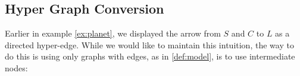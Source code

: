 \documentclass{article}
\begin{document}
	\subsection{Hyper Graph Conversion}\label{sec:hyper-convert}
	\begin{example}[continues=ex:planet]
		Earlier in example \ref{ex:planet}, we displayed the arrow from $S$ and $C$ to $L$ as a directed hyper-edge. While we would like to maintain this intuition, the way to do this is using only graphs with edges, as in \cref{def:model}, is to use intermediate nodes:
		
		\begin{center}
\end{center}
\end{example}
\end{document}
